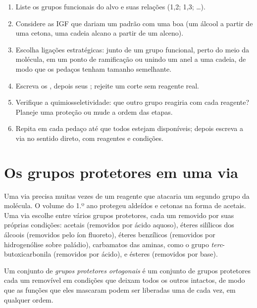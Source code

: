 \begin{method}\label{met:b2:retrosynthesis:retrosynthesis}
\begin{enumerate}
  \item Liste os grupos funcionais do alvo e suas relações (1,2; 1,3; \dots).
  \item Considere as IGF que dariam um padrão com uma boa  (um álcool a partir de uma cetona,
        uma cadeia alcano a partir de um alceno).
  \item Escolha ligações estratégicas: junto de um grupo funcional, perto do meio da molécula, em um
        ponto de ramificação ou unindo um anel a uma cadeia, de modo que os pedaços tenham tamanho
        semelhante.
  \item Escreva os , depois seus ; rejeite um corte sem reagente real.
  \item Verifique a quimiosseletividade: que outro grupo reagiria com cada reagente? Planeje uma
        proteção ou mude a ordem das etapas.
  \item Repita em cada pedaço até que todos estejam disponíveis; depois escreva a via no sentido
        direto, com reagentes e condições.
\end{enumerate}
\end{method}

\section{Os grupos protetores em uma via}

Uma via precisa muitas vezes de um reagente que atacaria um segundo grupo da molécula. O volume do
1.º ano protegeu aldeídos e cetonas na forma de acetais. Uma via escolhe entre vários grupos protetores,
cada um removido por suas próprias condições: acetais (removidos por ácido aquoso), éteres silílicos
dos álcoois (removidos pelo íon fluoreto), éteres benzílicos (removidos por hidrogenólise sobre paládio),
carbamatos das aminas, como o grupo \textit{terc}-butoxicarbonila (removidos por ácido), e ésteres
(removidos por base).

\begin{definition}\label{def:b2:retrosynthesis:orthogonal}
Um conjunto de \emph{grupos protetores ortogonais} é um conjunto de grupos
protetores cada um removível em condições que deixam todos os outros intactos, de modo que as funções
que eles mascaram podem ser liberadas uma de cada vez, em qualquer ordem.
\end{definition}

